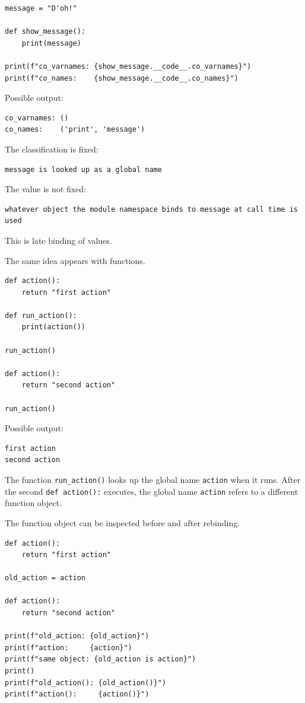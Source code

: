\begin{verbatim}
message = "D'oh!"

def show_message():
    print(message)

print(f"co_varnames: {show_message.__code__.co_varnames}")
print(f"co_names:    {show_message.__code__.co_names}")
\end{verbatim}

Possible output:

\begin{verbatim}
co_varnames: ()
co_names:    ('print', 'message')
\end{verbatim}

The classification is fixed:

\begin{verbatim}
message is looked up as a global name
\end{verbatim}

The value is not fixed:

\begin{verbatim}
whatever object the module namespace binds to message at call time is used
\end{verbatim}

This is late binding of values.

The same idea appears with functions.

\begin{verbatim}
def action():
    return "first action"

def run_action():
    print(action())

run_action()

def action():
    return "second action"

run_action()
\end{verbatim}

Possible output:

\begin{verbatim}
first action
second action
\end{verbatim}

The function \texttt{run\_action()} looks up the global name \texttt{action} when it runs. After the second \texttt{def action():} executes, the global name \texttt{action} refers to a different function object.

The function object can be inspected before and after rebinding.

\begin{verbatim}
def action():
    return "first action"

old_action = action

def action():
    return "second action"

print(f"old_action: {old_action}")
print(f"action:     {action}")
print(f"same object: {old_action is action}")
print()
print(f"old_action(): {old_action()}")
print(f"action():     {action()}")
\end{verbatim}

